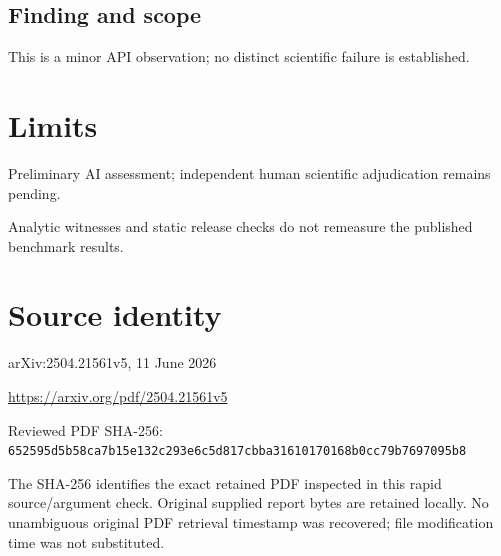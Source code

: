 \documentclass[11pt]{article}
\begin{document}
\subsection*{Finding and scope}

This is a minor API observation; no distinct scientific failure is established.

\section*{Limits}

Preliminary AI assessment; independent human scientific adjudication remains pending.\par

Analytic witnesses and static release checks do not remeasure the published benchmark results.\par

\section*{Source identity}

arXiv:2504.21561v5, 11 June 2026

\url{https://arxiv.org/pdf/2504.21561v5}

Reviewed PDF SHA-256: \nolinkurl{652595d5b58ca7b15e132c293e6c5d817cbba31610170168b0cc79b7697095b8}

The SHA-256 identifies the exact retained PDF inspected in this rapid source/argument check. Original supplied report bytes are retained locally. No unambiguous original PDF retrieval timestamp was recovered; file modification time was not substituted.
\end{document}
